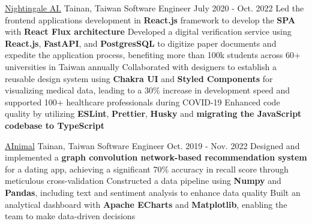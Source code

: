 \resumeExpEntry
{\href{https://19gale.ai}{Nightingale AI.}}
{Tainan, Taiwan}
{Software Engineer}
{July 2020 - Oct. 2022}
{
  \resumeItemListStart
    \resumeItem
    {Led the frontend applications development in \textbf{React.js} framework to develop the \textbf{SPA} with \textbf{React Flux architecture}}
    \resumeItem
    {Developed a digital verification service using \textbf{React.js}, \textbf{FastAPI}, and \textbf{PostgresSQL} to digitize paper documents and expedite the application process, benefiting more than 100k students across 60+ universities in Taiwan annually}
    \resumeItem
    {Collaborated with designers to establish a reusable design system using \textbf{Chakra UI} and \textbf{Styled Components} for visualizing medical data, leading to a 30\% increase in development speed and supported 100+ healthcare professionals during COVID-19}
    \resumeItem
    {Enhanced code quality by utilizing \textbf{ESLint}, \textbf{Prettier}, \textbf{Husky} and \textbf{migrating the JavaScript codebase to TypeScript}}
  \resumeItemListEnd
}

\resumeExpEntry
{\href{https://ainimal.io}{AInimal}}
{Tainan, Taiwan}
{Software Engineer}
{Oct. 2019 - Nov. 2022}
{
  \resumeItemListStart
    \resumeItem
    {Designed and implemented a \textbf{graph convolution network-based recommendation system} for a dating app, achieving a significant 70\% accuracy in recall score through meticulous cross-validation}
    \resumeItem
    {Constructed a data pipeline using \textbf{Numpy} and \textbf{Pandas}, including text and sentiment analysis to enhance data quality}
    \resumeItem
    {Built an analytical dashboard with \textbf{Apache ECharts} and \textbf{Matplotlib}, enabling the team to make data-driven decisions}
  \resumeItemListEnd
}

